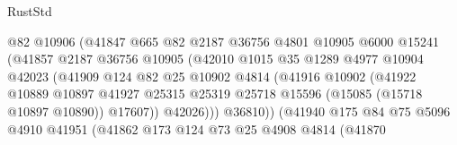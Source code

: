 \begin{lexlean}{RustStd}
\begin{coremodule}
                                  @82
                                  @10906
                                  (@41847
                                    @665
                                    @82
                                    @2187
                                    @36756
                                    @4801
                                    @10905
                                    @6000
                                    @15241
                                    (@41857
                                      @2187
                                      @36756
                                      @10905
                                      (@42010
                                        @1015
                                        @35
                                        @1289
                                        @4977
                                        @10904
                                        @42023
                                        (@41909
                                          @124
                                          @82
                                          @25
                                          @10902
                                          @4814
                                          (@41916
                                            @10902
                                            (@41922
                                              @10889
                                              @10897
                                              @41927
                                              @25315
                                              @25319
                                              @25718
                                              @15596
                                              (@15085 (@15718 @10897 @10890))
                                              @17607))
                                          @42026)))
                                    @36810))
                                (@41940
                                  @175
                                  @84
                                  @75
                                  @5096
                                  @4910
                                  @41951
                                  (@41862
                                    @173
                                    @124
                                    @73
                                    @25
                                    @4908
                                    @4814
                                    (@41870

\end{coremodule}
\end{lexlean}
